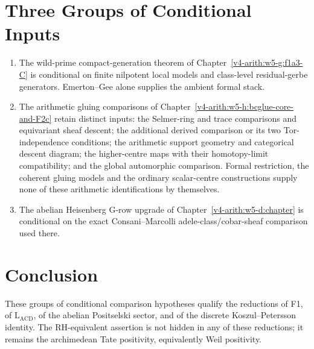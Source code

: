 \section{Three Groups of Conditional Inputs}
\label{v4-arith:w6-j:conditional-points}

\begin{enumerate}
\item The wild-prime compact-generation theorem of
Chapter~\ref{v4-arith:w5-g:f1a3-C} is conditional on finite nilpotent
local models and class-level residual-gerbe generators.  Emerton--Gee
alone supplies the ambient formal stack.

\item The arithmetic gluing comparisons of
Chapter~\ref{v4-arith:w5-h:bcglue-core-and-F2c} retain distinct inputs:
the Selmer-ring and trace comparisons and equivariant sheaf descent;
the additional derived comparison or its two Tor-independence conditions;
the arithmetic support geometry and categorical descent diagram;
the higher-centre maps with their homotopy-limit compatibility; and the
global automorphic comparison. Formal restriction, the coherent gluing
models and the ordinary scalar-centre constructions supply none of these
arithmetic identifications by themselves.

\item The abelian Heisenberg G-row upgrade of
Chapter~\ref{v4-arith:w5-d:chapter} is conditional on the exact
Consani--Marcolli adele-class/cobar-sheaf comparison used there.
\end{enumerate}

\section{Conclusion}
\label{v4-arith:w6-j:summary}

These groups of conditional comparison hypotheses qualify the reductions
of F1, of
\(\mathrm{L}_{\mathrm{ACD}}\), of the abelian Positselski sector, and of
the discrete Koszul--Petersson identity.  The RH-equivalent assertion is
not hidden in any of these reductions; it remains the archimedean Tate
positivity, equivalently Weil positivity.
